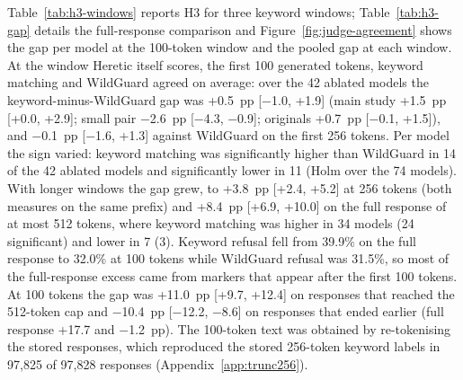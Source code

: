 Table~\ref{tab:h3-windows} reports H3 for three keyword windows; Table~\ref{tab:h3-gap}
details the full-response comparison and Figure~\ref{fig:judge-agreement} shows the gap per model at the
100-token window and the pooled gap at each window. At
the window Heretic itself scores, the first 100 generated tokens, keyword
matching and WildGuard agreed on average: over the 42 ablated models the
keyword-minus-WildGuard gap was +0.5~pp [$-$1.0, +1.9] (main study +1.5~pp
[+0.0, +2.9]; small pair $-$2.6~pp [$-$4.3, $-$0.9]; originals +0.7~pp
[$-$0.1, +1.5]), and $-$0.1~pp [$-$1.6, +1.3] against WildGuard on the first
256 tokens. Per model the sign varied: keyword matching was significantly
higher than WildGuard in 14 of the 42 ablated models and significantly lower
in 11 (Holm over the 74 models). With longer windows the gap grew, to +3.8~pp
[+2.4, +5.2] at 256 tokens (both measures on the same prefix) and +8.4~pp [+6.9, +10.0] on the full response of
at most 512 tokens, where keyword matching was higher in 34 models (24
significant) and lower in 7 (3). Keyword refusal fell from 39.9\% on the full
response to 32.0\% at 100 tokens while WildGuard refusal was 31.5\%, so most
of the full-response excess came from markers that appear after the first 100
tokens. At 100 tokens the gap was +11.0~pp [+9.7, +12.4] on responses that
reached the 512-token cap and $-$10.4~pp [$-$12.2, $-$8.6] on responses that
ended earlier (full response +17.7 and $-$1.2~pp). The 100-token text was
obtained by re-tokenising the stored responses, which reproduced the stored
256-token keyword labels in 97,825 of 97,828 responses
(Appendix~\ref{app:trunc256}).

